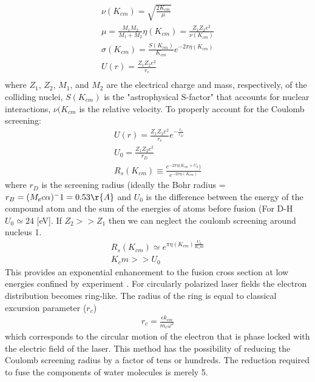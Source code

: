 \documentclass[English]{article}
\begin{document}
\begin{gather*}
    \nu(K_{cm})=\sqrt{\frac{2K_{cm}}{\mu}}\\
    \mu=\frac{M_1M_2}{M_1+M_2}
    \eta(K_{cm})=\frac{Z_1Z_2e^2}{\nu(K_{cm})}\\
    \sigma(K_{cm})=\frac{S(K_{cm})}{K_{cm}}e^{-2\pi\eta(K_{cm})}\\
    U(r)=\frac{Z_1Z_2e^2}{r_c}\\
\end{gather*}
where $Z_1$, $Z_2$, $M_1$, and $M_2$ are the electrical charge and mass, respectively, of the colliding nuclei, $S(K_{cm})$ is the "astrophysical S-factor" that accounts for nuclear interactions, $\nu(K_{cm}$ is the relative velocity. To properly account for the Coulomb screening:
\begin{gather*}
    U(r)=\frac{Z_1Z_2e^2}{r_c}e^{-\frac{r_c}{r_D}}\\
    U_0=\frac{Z_1Z_2e^2}{r_D}\\
    R_s(K_{cm})\equiv\frac{e^{-2 \pi \eta (K_{cm} + U_0})}{e^{-2 \pi \eta (K_{cm})}}
\end{gather*}
where $r_D$ is the screening radius (ideally the Bohr radius = 
$r_B=(M_e c \alpha)^-1=0.53 \r{A}$ and $U_0$ is the difference between the energy of the compound atom and the sum of the energies of atoms before fusion (For D-H $U_0\simeq 24$ [eV]. If $Z_2>>Z_1$ then we can neglect the coulomb screening around nucleus 1. 
\begin{gather*}
    R_s(K_{cm})\simeq e^{\pi \eta (K_{cm}) \frac{U_0}{K_cm}}\\
    K_cm >> U_0
\end{gather*}
This provides an exponential enhancement to the fusion cross section at low energies confined by experiment \cite{PhysRev.106.330}.
For circularly polarized laser fields the electron distribution becomes ring-like. The radius of the ring is equal to classical excursion parameter ($r_c$) 
\begin{gather*}
    r_c=\frac{e k_{cm}}{m_e \omega^2}
\end{gather*}
which corresponds to the circular motion of the electron that is phase locked with the electric field of the laser.
This method has the possibility of reducing the Coulomb screening radius by a factor of tens or hundreds. The reduction required to fuse the components of water molecules is merely 5.  



\newpage
\printbibliography
\end{document}
